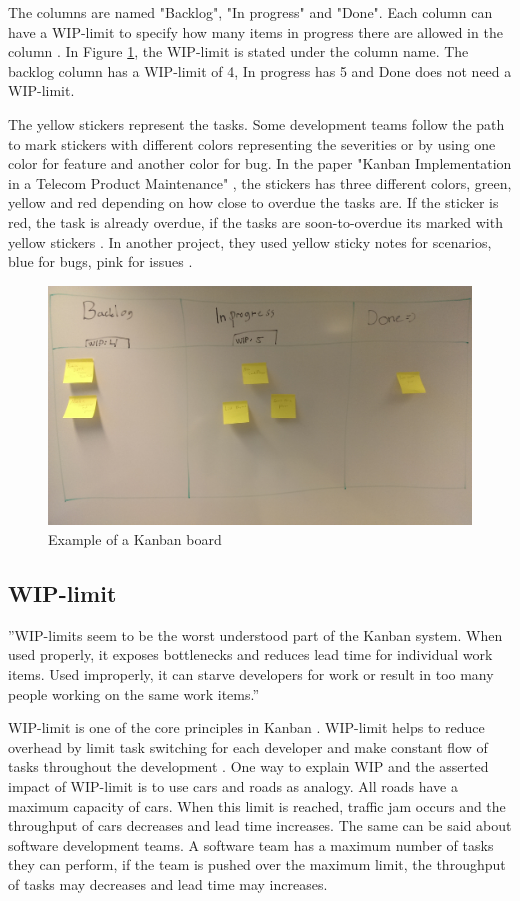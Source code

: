 \documentclass[UKenglish]{ifimaster}  %
\begin{document}
The columns are named "Backlog", "In progress" and "Done".  Each column can have a WIP-limit to specify how many items in progress there are allowed in the column \parencite{Joyce}. In Figure \ref{kanban_board}, the WIP-limit is stated under the column name. The backlog column has a WIP-limit of 4, In progress has 5 and Done does not need a WIP-limit. 

The yellow stickers represent the tasks. Some development teams follow the path to mark stickers with different colors representing the severities or by using one color for feature and another color for bug. In the paper "Kanban Implementation in a Telecom Product Maintenance" \parencite{6068363}, the stickers has three different colors, green, yellow and red depending on how close to overdue the tasks are. If the sticker is red, the task is already overdue, if the tasks are soon-to-overdue its marked with yellow stickers . In another project, they used yellow sticky notes for scenarios, blue for bugs, pink for issues \parencite{Shinkle}.
\begin{figure}[!htbp]
\centering
\includegraphics[width=\textwidth]{Picture/kanban_board.jpg}
\caption{Example of a Kanban board}
\label{kanban_board}
\end{figure}

\subsection{WIP-limit}
\label{WIPsec}
''WIP-limits seem to be the worst understood part of the Kanban system. When used properly, it exposes bottlenecks and reduces lead time for individual work items. Used improperly, it can starve developers for work or result in too many people working on the same work items.'' \parencite{Shinkle}

WIP-limit is one of the core principles in Kanban \parencite{6068363}. WIP-limit helps to reduce overhead by limit task switching for each developer and make constant flow of tasks throughout the development \parencite{DavidAnderson}. One way to explain WIP and the asserted impact of WIP-limit is to use cars and roads as analogy. All roads have a maximum capacity of cars. When this limit is reached, traffic jam occurs and the throughput of cars decreases and lead time increases. The same can be said about software development teams. A software team has a maximum number of tasks they can perform, if the team is pushed over the maximum limit, the throughput of tasks may decreases and lead time may increases.
\end{document}
